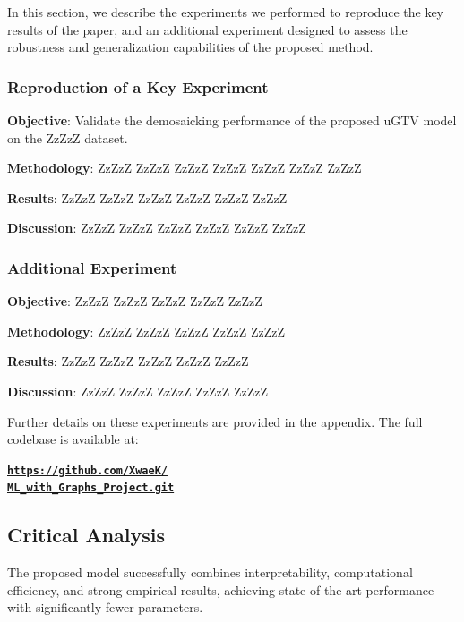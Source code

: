 \documentclass{article}
\theoremstyle{plain}
\theoremstyle{definition}
\theoremstyle{remark}
\begin{document}
In this section, we describe the experiments we performed to reproduce the key results of the paper, and an additional experiment designed to assess the robustness and generalization capabilities of the proposed method.

\subsubsection{Reproduction of a Key Experiment}


\textbf{Objective}: Validate the demosaicking performance of the proposed uGTV model on the ZzZzZ dataset.

\textbf{Methodology}: ZzZzZ ZzZzZ ZzZzZ ZzZzZ ZzZzZ ZzZzZ ZzZzZ 

\textbf{Results}: ZzZzZ ZzZzZ ZzZzZ ZzZzZ ZzZzZ ZzZzZ 

\textbf{Discussion}: ZzZzZ ZzZzZ ZzZzZ ZzZzZ ZzZzZ ZzZzZ 

\subsubsection{Additional Experiment}

\textbf{Objective}: ZzZzZ ZzZzZ ZzZzZ ZzZzZ ZzZzZ 

\textbf{Methodology}: ZzZzZ ZzZzZ ZzZzZ ZzZzZ ZzZzZ 

\textbf{Results}: ZzZzZ ZzZzZ ZzZzZ ZzZzZ ZzZzZ 

\textbf{Discussion}: ZzZzZ ZzZzZ ZzZzZ ZzZzZ ZzZzZ 

Further details on these experiments are provided in the appendix. The full codebase is available at:
\begin{center}
\vskip -0.1in
\href{https://github.com/XwaeK/ML_with_Graphs_Project.git}{\textbf{\texttt{https://github.com/XwaeK/\\ML\_with\_Graphs\_Project.git}}}
\vskip -0.1in
\end{center}

\subsection{Critical Analysis}

The proposed model successfully combines interpretability, computational efficiency, and strong empirical results, achieving state-of-the-art performance with significantly fewer parameters.
\end{document}
